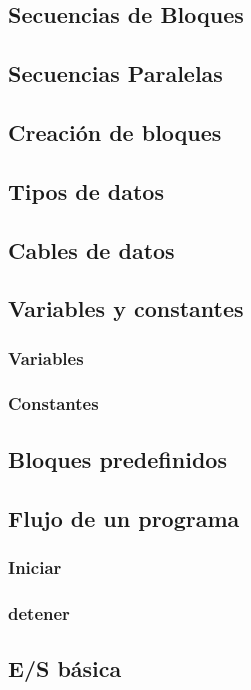 \documentclass[12pt,a4paper]{article}
\begin{document}
\subsection{Secuencias de Bloques}
\subsection{Secuencias Paralelas}
\subsection{Creación de bloques}
\subsection{Tipos de datos}
\subsection{Cables de datos}
\subsection{Variables y constantes}
\subsubsection{Variables}
\subsubsection{Constantes}
\subsection{Bloques predefinidos}
\subsection{Flujo de un programa}
\subsubsection{Iniciar}
\subsubsection{detener}
\subsection{E/S básica}
\end{document}
